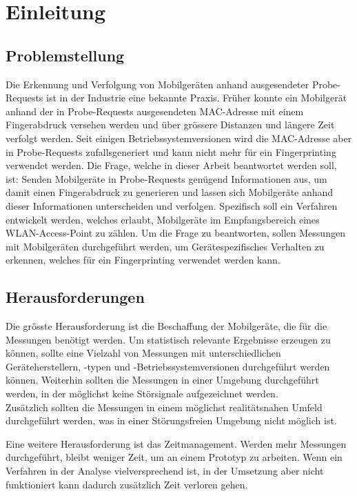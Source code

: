 \section{Einleitung}

\subsection{Problemstellung}
Die Erkennung und Verfolgung von Mobilgeräten anhand ausgesendeter Probe-Requests
ist in der Industrie eine bekannte Praxis.
Früher konnte ein Mobilgerät anhand der in Probe-Requests ausgesendeten MAC-Adresse
mit einem Fingerabdruck versehen werden und über grössere Distanzen und längere 
Zeit verfolgt werden. 
Seit einigen Betriebssystemversionen wird die MAC-Adresse aber in Probe-Requests 
zufallsgeneriert und kann nicht mehr für ein Fingerprinting verwendet werden.
Die Frage, welche in dieser Arbeit beantwortet werden soll, ist: 
Senden Mobilgeräte in Probe-Requests genügend Informationen aus, um damit 
einen Fingerabdruck zu generieren und lassen sich Mobilgeräte anhand dieser 
Informationen unterscheiden und verfolgen.
Spezifisch soll ein Verfahren entwickelt werden, welches erlaubt, Mobilgeräte 
im Empfangsbereich eines WLAN-Access-Point zu zählen.
Um die Frage zu beantworten, sollen Messungen mit Mobilgeräten durchgeführt werden,
um Gerätespezifisches Verhalten zu erkennen, welches für ein Fingerprinting 
verwendet werden kann.

\subsection{Herausforderungen}
Die grösste Herausforderung ist die Beschaffung der Mobilgeräte, die für die 
Messungen benötigt werden.
Um statistisch relevante Ergebnisse erzeugen zu können, sollte eine Vielzahl von 
Messungen mit unterschiedlichen Geräteherstellern, -typen und -Betriebssystemversionen
durchgeführt werden können.
Weiterhin sollten die Messungen in einer Umgebung durchgeführt werden, in der 
möglichst keine Störsignale aufgezeichnet werden. \\
Zusätzlich sollten die Messungen in einem möglichst realitätsnahen Umfeld durchgeführt
werden, was in einer Störungsfreien Umgebung nicht möglich ist.

Eine weitere Herausforderung ist das Zeitmanagement. 
Werden mehr Messungen durchgeführt, bleibt weniger Zeit, um an einem Prototyp zu 
arbeiten. 
Wenn ein Verfahren in der Analyse vielversprechend ist, in der Umsetzung aber 
nicht funktioniert kann dadurch zusätzlich Zeit verloren gehen.

